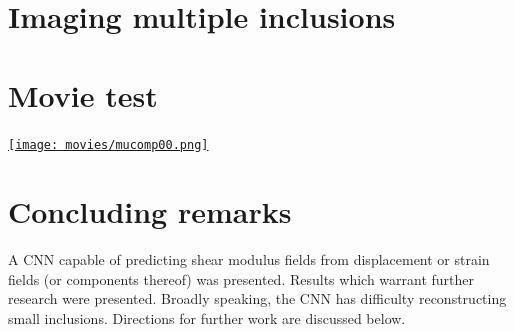 \documentclass[12pt]{article}
\begin{document}
\section{Imaging multiple inclusions}
%
%
\section{Movie test}
\href{run:movies/movie.mp4}{\texttt{[image: movies/mucomp00.png]}}
\section{Concluding remarks}
A CNN capable of predicting shear modulus fields from displacement or strain fields (or components thereof) was presented. Results which warrant further research were presented. Broadly speaking, the CNN has difficulty reconstructing small inclusions. Directions for further work are discussed below. 
\end{document}
